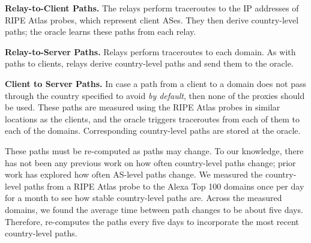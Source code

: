 \textbf{Relay-to-Client Paths.} The relays perform
traceroutes to the IP addresses of RIPE Atlas probes, which 
represent client ASes.  They then derive country-level paths; the
oracle learns these paths from each relay.  

\textbf{Relay-to-Server Paths.} Relays perform 
traceroutes to each domain.  As with paths to clients,
relays derive country-level paths and send them to the oracle.

\textbf{Client to Server Paths.} In case a path from a client to a 
domain does not pass through the country specified to avoid {\it by default}, 
then none of the proxies should be used.  
These paths are measured using the RIPE Atlas probes in similar
locations as the clients, and the oracle triggers traceroutes from
each of them to each of the domains.  Corresponding country-level
paths are stored at the oracle.

These paths must be re-computed 
as paths may change.  To our knowledge, there has not been any previous work 
on how often country-level paths change; prior work has explored how often 
AS-level paths change.  We measured the country-level paths from a RIPE Atlas probe to the 
Alexa Top 100 domains once per day for a month to see how stable country-level paths 
are.  Across the measured domains, we found the average time between path changes to 
be about five days.  Therefore, \system{} re-computes the paths every five days to incorporate the 
most recent country-level paths.  




